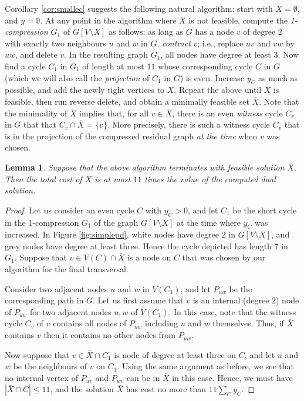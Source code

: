 \documentclass{article}
\newcommand{\0}{\mathbb{0}}
\newcommand{\1}{\mathbb{1}}
\newtheorem{lemma}[theorem]{Lemma}
\begin{document}
Corollary \ref{cor:smallec} suggests the following natural algorithm:
start with $X=\emptyset$, and $y=\0$. At any point in the algorithm
where $X$ is not feasible, compute the {\em 1-compression} $G_1$ of
$G[V\setminus X]$ as follows: as long as $G$ has a node $v$ of degree 2 with
exactly two neighbours $u$ and $w$ in $G$, {\em contract} $v$; i.e.,
replace $uv$ and $vw$ by $uw$, and delete $v$. In the resulting graph
$G_1$, all nodes have degree at least $3$. Now find a cycle $C_1$ in
$G_1$ of length at most $11$ whose corresponding cycle $C$ in $G$
(which we will also call the {\em projection} of $C_1$ in $G$)
is
even. Increase $y_C$ as much as possible, and add the newly tight
vertices to $X$. Repeat the above until $X$ is feasible, then run
reverse delete, and obtain a minimally feasible set $\bar{X}$. Note
that the minimality of $\bar{X}$ implies that, for all
$v \in \bar{X}$, there is an even {\em witness} cycle $C_v$ in $G$
that that $C_v \cap \bar{X} = \{v\}$. More precisely,  there is such a
witness cycle $C_v$ that is in the projection of  the compressed
residual graph {\em at the time} when $v$ was chosen. 

\begin{lemma} \label{lem:simplealg}
  Suppose that the above algorithm terminates with
  feasible solution $\bar{X}$. Then the total cost of $\bar{X}$ is at
  most $11$ times the value of the computed dual solution.
\end{lemma}
\begin{proof}
  Let us consider an even cycle $C$ with $y_C>0$, and let $C_1$ be the
  short cycle in the 1-compression $G_1$ of the graph $G[V\setminus
  X]$ at the time where $y_C$ was increased. 
  In Figure
  \ref{fig:simplepd}, white nodes have degree $2$ in $G[V\setminus
  X]$, and grey nodes have degree at least three. Hence the cycle
  depicted has length $7$ in $G_1$. Suppose that $v \in V(C) \cap
  \bar{X}$ is a node on $C$ that was chosen by our algorithm for the
  final transversal.

  Consider two adjacent nodes $u$ and $w$ in $V(C_1)$, and let
  $P_{uw}$ be the corresponding path in $G$. 
  Let us first assume that $v$ is an internal (degree $2$) node of
  $P_{uw}$ for two adjacent nodes $u,w$ of $V(C_1)$. In this case,
  note that the witness cycle $C_v$ of $v$ contains all nodes of
  $P_{uw}$ including $u$ and $w$ themselves. Thus, if $\bar{X}$
  contains $v$ then it contains no other nodes from $P_{uw}$.

  Now suppose that $v \in \bar{X} \cap C_1$ is node of
  degree at least three on $C$, and let $u$ and $w$ be the neighbours
  of $v$ on $C_1$. Using the same argument as before, we see that
  no internal vertex of $P_{uv}$ and $P_{wv}$ can be in $\bar{X}$ in
  this case. Hence, we must have
  $|\bar{X} \cap C| \leq 11$, and the solution
  $\bar{X}$ has cost no more than $11\sum_Cy_C$. 
\end{proof}
\end{document}

